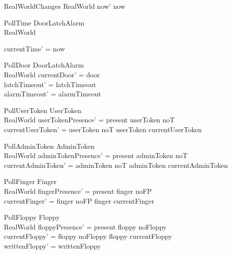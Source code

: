 \begin{schema}{RealWorldChanges}
        \Delta RealWorld
\where
        now' \geq now
\end{schema}

\begin{schema}{PollTime}
	\Delta DoorLatchAlarm
\\       RealWorld

\where
	currentTime' = now
\end{schema}

\begin{schema}{PollDoor}
	\Delta DoorLatchAlarm
\\	RealWorld
\where
	currentDoor' = door
\\	latchTimeout' = latchTimeout
\\	alarmTimeout' = alarmTimeout
\end{schema}

\begin{schema}{PollUserToken}
        \Delta UserToken
\\	RealWorld
\where
	userTokenPresence' = present \iff userToken \neq noT
\\	currentUserToken' =  \IF userToken \neq noT \THEN userToken \ELSE currentUserToken
\end{schema}

\begin{schema}{PollAdminToken}
	\Delta AdminToken
\\      RealWorld
\where
	adminTokenPresence' = present \iff adminToken \neq noT
\\	currentAdminToken' = \IF adminToken \neq noT \THEN
adminToken \ELSE currentAdminToken
\end{schema}

\begin{schema}{PollFinger}
	\Delta Finger
\\	RealWorld
\where
	fingerPresence' = present \iff finger \neq noFP
\\	currentFinger' = \IF finger \neq noFP \THEN finger \ELSE currentFinger
\end{schema}

\begin{schema}{PollFloppy}
        \Delta Floppy
\\      RealWorld
\where
	floppyPresence' = present \iff floppy \neq noFloppy
\\      currentFloppy' = \IF floppy \neq noFloppy \THEN floppy \ELSE currentFloppy
\\      writtenFloppy' = writtenFloppy
\end{schema}

